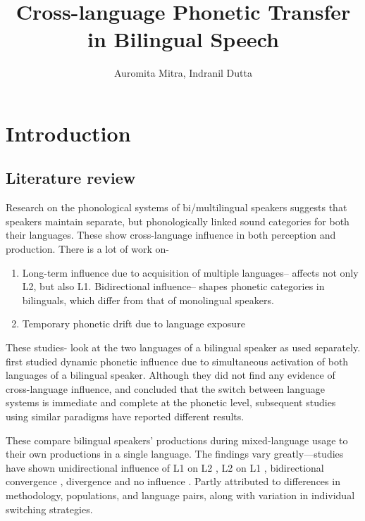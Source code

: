 \documentclass[11pt]{article}
\title{Cross-language Phonetic Transfer in Bilingual Speech}
\date{}
\author{Auromita Mitra, Indranil Dutta}
\begin{document}
\maketitle
	
% 

\section{Introduction}
\subsection{Literature review}

Research on the phonological systems of bi/multilingual speakers suggests that speakers maintain separate, but phonologically linked sound categories for both their languages. These show cross-language influence in both perception and production. There is a lot of work on-
\begin{enumerate}[label=(\roman*)]
	
{}\item Long-term influence due to acquisition of multiple languages-- affects not only L2, but also L1. Bidirectional influence-- shapes phonetic categories in bilinguals, which differ from that of monolingual speakers\cite{caramazza1973acquisition, flege1987production, guion2003vowel}.

\item Temporary phonetic drift due to language exposure \cite{sancier1997gestural,chang2012rapid,tobin2017phonetic}
\end{enumerate}
These studies- look at the two languages of a bilingual speaker as used separately.
\cite{grosjean1994going} first studied dynamic phonetic influence due to simultaneous activation of both languages of a bilingual speaker. Although they did not find any evidence of cross-language influence, and concluded that the switch between language systems is immediate and complete at the phonetic level, subsequent studies using similar paradigms have reported different results.

These compare bilingual speakers’ productions during mixed-language usage to their own productions in a single language. The findings vary greatly—studies have shown unidirectional influence of L1 on L2 \cite{balukas2015spanish,antoniou2011inter,vsimavckova2015immediate,goldrick2014language}, L2 on L1 \cite{tsui2019impact,elias2017effects}, bidirectional convergence \cite{bullock2009trying, olson2016role}, divergence \cite{bullock2009trying,vsimavckova2018patterns} and no influence \cite{muldner2019phonetics,schwartz2015language}. Partly attributed to differences in methodology, populations, and language pairs, along with variation in individual switching strategies. 
\end{document}
